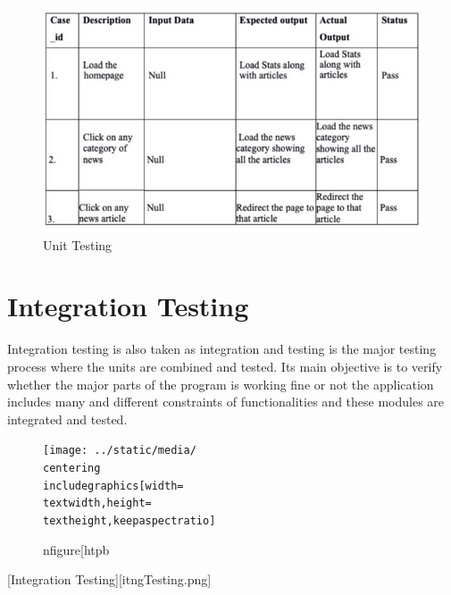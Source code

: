 \begin{figure}[htpb]
\centering
\includegraphics[width=\textwidth,height=\textheight,keepaspectratio]{../static/media/testCases.png}
\caption{Unit Testing}
\end{figure}


\section{Integration Testing}

Integration testing is also taken as integration and testing is the major testing process where the units are combined and tested. Its main objective is to verify whether the major parts of the program is working fine or not the application includes many and different constraints of functionalities and these modules are integrated and tested.

\begin{figure}[htpb]
\centering
\texttt{[image: ../static/media/\\centering
\\includegraphics[width=\\textwidth,height=\\textheight,keepaspectratio]}
\caption{n{figure}[htpb}
\end{figure}[Integration Testing][itngTesting.png]
